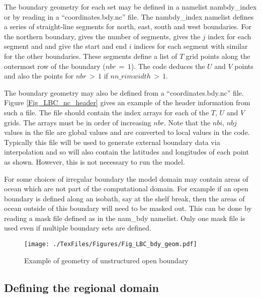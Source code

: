 The boundary geometry for each set may be defined in a namelist
nambdy\_index or by reading in a ``coordinates.bdy.nc'' file.
The
nambdy\_index namelist defines a series of straight-line
segments for
north, east, south and west boundaries. For the northern
boundary,
 gives the number of segments,  gives
the $j$
index for each segment and  and  give the
start
and end $i$ indices for each segment with similar for the other
boundaries. These segments define a list of $T$ grid points
along the
outermost row of the boundary ($nbr\,=\, 1$). The code deduces
the $U$ and
$V$ points and also the points for $nbr\,>\, 1$ if
$nn\_rimwidth\,>\,1$.

The boundary geometry may also be defined from a
``coordinates.bdy.nc'' file. Figure \ref{Fig_LBC_nc_header}
gives an example of the header information from such a file. The
file
should contain the index arrays for each of the $T$, $U$ and $V$grids. The
arrays must be in order of increasing $nbr$. Note
that the
$nbi$, $nbj$ values in the file are global values and are
converted to
local values in the code. Typically this file will be used to
generate
external boundary data via interpolation and so will also
contain the
latitudes and longitudes of each point as shown. However, this
is not
necessary to run the model.

For some choices of irregular boundary the model domain may
contain
areas of ocean which are not part of the computational domain.
For
example if an open boundary is defined along an isobath, say at
the
shelf break, then the areas of ocean outside of this boundary
will
need to be masked out. This can be done by reading a mask file
defined
as  in the nam\_bdy namelist. Only one mask
file is
used even if multiple boundary sets are defined.

\begin{figure}[!t]      \begin{center}
\texttt{[image: ./TexFiles/Figures/Fig\_LBC\_bdy\_geom.pdf]}
\caption {      \label{Fig_LBC_bdy_geom}
Example of geometry of unstructured open boundary}
\end{center}   \end{figure}


\subsection{Defining the regional domain}
\label{domain}

